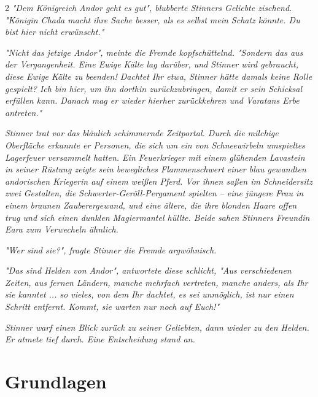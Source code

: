 \documentclass[10pt, a4paper, oneside]{book}
\newcommand{\fan}[1]{\textit{#1}}
\begin{document}
\begin{multicols*}{2}
\textit{\fan{"Dem Königreich Andor geht es gut", blubberte Stinners Geliebte zischend. "Königin Chada macht ihre Sache besser, als es selbst mein Schatz könnte. Du bist hier nicht erwünscht." }}

\textit{\fan{"Nicht das jetzige Andor", meinte die Fremde kopfschüttelnd. "Sondern das aus der Vergangenheit. Eine Ewige Kälte lag darüber, und Stinner wird gebraucht, diese Ewige Kälte zu beenden! Dachtet Ihr etwa, Stinner hätte damals keine Rolle gespielt? Ich bin hier, um ihn dorthin zurückzubringen, damit er sein Schicksal erfüllen kann. Danach mag er wieder hierher zurückkehren und Varatans Erbe antreten."}}

\textit{\fan{Stinner trat vor das bläulich schimmernde Zeitportal. Durch die milchige Oberfläche erkannte er Personen, die sich um ein von Schneewirbeln umspieltes Lagerfeuer versammelt hatten. Ein Feuerkrieger mit einem glühenden Lavastein in seiner Rüstung zeigte sein bewegliches Flammenschwert einer blau gewandten andorischen Kriegerin auf einem weißen Pferd. Vor ihnen saßen im Schneidersitz zwei Gestalten, die Schwerter-Geröll-Pergament spielten – eine jüngere Frau in einem braunen Zauberergewand, und eine ältere, die ihre blonden Haare offen trug und sich einen dunklen Magiermantel hüllte. Beide sahen Stinners Freundin Eara zum Verwecheln ähnlich.}}

\textit{\fan{"Wer sind sie?", fragte Stinner die Fremde argwöhnisch.}}

\textit{\fan{"Das sind Helden von Andor", antwortete diese schlicht, "Aus verschiedenen Zeiten, aus fernen Ländern, manche mehrfach vertreten, manche anders, als Ihr sie kanntet ... so vieles, von dem Ihr dachtet, es sei unmöglich, ist nur einen Schritt entfernt. Kommt, sie warten nur noch auf Euch!"}}

\textit{\fan{Stinner warf einen Blick zurück zu seiner Geliebten, dann wieder zu den Helden. Er atmete tief durch. Eine Entscheidung stand an.}}



\newpage


\setcounter{tocdepth}{0}
\tableofcontents






\end{multicols*}


\chapter{Grundlagen}
\label{grundlagen}
\end{document}
